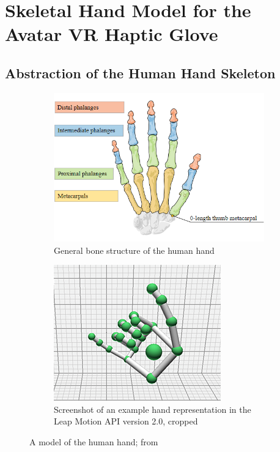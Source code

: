 \documentclass[hyperref, bachelorofscience]{cgvpub}
\begin{document}
\section{Skeletal Hand Model for the Avatar VR Haptic Glove} \label{sec:hand_model}
\subsection{Abstraction of the Human Hand Skeleton}
\begin{figure}
	\begin{subfigure}{.5\linewidth}
		\includegraphics[width=\linewidth]{../pics/leap_anat}
		\caption{General bone structure of the human hand}
		\label{fig:hand_model:anat}
	\end{subfigure}
	\hfill
	\begin{subfigure}{.47\linewidth}
		\includegraphics[width=\linewidth]{../pics/leap_example}
		\caption{Screenshot of an example hand representation in the Leap Motion API version 2.0, cropped}
		\label{fig:hand_model:leap}
	\end{subfigure}
	\caption{A model of the human hand; from \cite{leaphand}}
	\label{fig:hand_model}
\end{figure}
\end{document}
